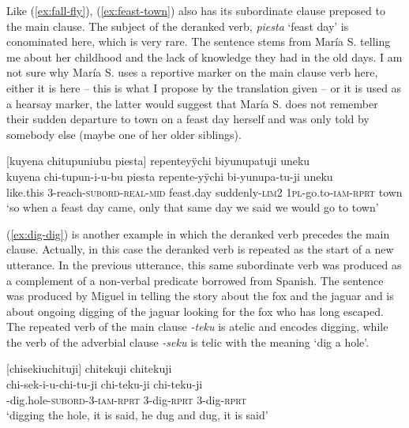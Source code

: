 Like (\ref{ex:fall-fly}), (\ref{ex:feast-town}) also has its subordinate clause preposed to the main clause. The subject of the deranked verb, \textit{piesta} ‘feast day’ is conominated here, which is very rare. The sentence stems from María S. telling me about her childhood and the lack of knowledge they had in the old days. I am not sure why María S. uses a reportive marker on the main clause verb here, either it is  here – this is what I propose by the translation given – or it is used as a hearsay marker, the latter would suggest that María S. does not remember their sudden departure to town on a feast day herself and was only told by somebody else (maybe one of her older siblings).

\ea\label{ex:feast-town}
\begingl
\glpreamble \textup{[}kuyena chitupuniubu piesta\textup{]} repenteyÿchi biyunupatuji uneku\\
\gla kuyena chi-tupun-i-u-bu piesta repente-yÿchi bi-yunupa-tu-ji uneku\\
\glb like.this 3-reach-\textsc{subord}-\textsc{real}-\textsc{mid} feast.day suddenly-\textsc{lim}2 1\textsc{pl}-go.to-\textsc{iam}-\textsc{rprt} town\\
\glft ‘so when a feast day came, only that same day we said we would go to town’
\endgl
\trailingcitation{[rxx-p181101l-2.017]}
\xe


(\ref{ex:dig-dig}) is another example in which the deranked verb precedes the main clause. Actually, in this case the deranked verb is repeated as the start of a new utterance. In the previous utterance, this same subordinate verb was produced as a complement of a non-verbal predicate borrowed from Spanish. The sentence was produced by Miguel in telling the story about the fox and the jaguar and is about ongoing digging of the jaguar looking for the fox who has long escaped. The repeated verb of the main clause \textit{-teku} is atelic and encodes digging, while the verb of the adverbial clause \textit{-seku} is telic with the meaning ‘dig a hole’.

\ea\label{ex:dig-dig}
\begingl
\glpreamble \textup{[}chisekiuchituji\textup{]} chitekuji chitekuji\\
\gla chi-sek-i-u-chi-tu-ji chi-teku-ji chi-teku-ji\\
-dig.hole-\textsc{subord}-3-\textsc{iam}-\textsc{rprt} 3-dig-\textsc{rprt} 3-dig-\textsc{rprt}\\
\glft ‘digging the hole, it is said, he dug and dug, it is said’
\endgl
\trailingcitation{[jmx-n120429ls-x5.163]}
\xe

